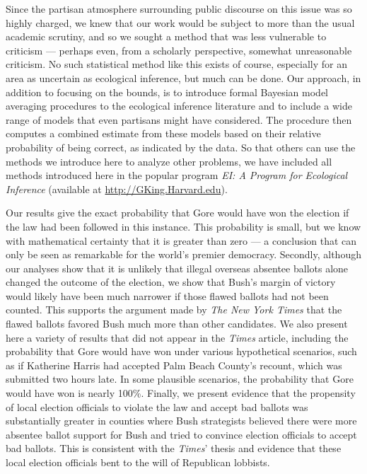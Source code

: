 \documentclass[11pt,titlepage]{article}
\begin{document}
Since the partisan atmosphere surrounding public discourse on this
issue was so highly charged, we knew that our work would be subject to
more than the usual academic scrutiny, and so we sought a method that
was less vulnerable to criticism --- perhaps even, from a scholarly
perspective, somewhat unreasonable criticism.  No such statistical
method like this exists of course, especially for an area as uncertain
as ecological inference, but much can be done.  Our approach, in
addition to focusing on the bounds, is to introduce formal Bayesian
model averaging procedures to the ecological inference literature and
to include a wide range of models that even partisans might have
considered.  The procedure then computes a combined estimate from
these models based on their relative probability of being correct, as
indicated by the data.  So that others can use the methods we
introduce here to analyze other problems, we have included all methods
introduced here in the popular program \emph{EI: A Program for
  Ecological Inference} (available at \url{http://GKing.Harvard.edu}).

Our results give the exact probability that Gore would have won the
election if the law had been followed in this instance.  This
probability is small, but we know with mathematical certainty that it
is greater than zero --- a conclusion that can only be seen as
remarkable for the world's premier democracy.  Secondly, although our
analyses show that it is unlikely that illegal overseas absentee
ballots alone changed the outcome of the election, we show that Bush's
margin of victory would likely have been much narrower if those flawed
ballots had not been counted.  This supports the argument made by
\emph{The New York Times} that the flawed ballots favored Bush much
more than other candidates.  We also present here a variety of results
that did not appear in the \emph{Times} article, including the
probability that Gore would have won under various hypothetical
scenarios, such as if Katherine Harris had accepted Palm Beach
County's recount, which was submitted two hours late.  In some
plausible scenarios, the probability that Gore would have won is
nearly 100\%.  Finally, we present evidence that the propensity of
local election officials to violate the law and accept bad ballots was
substantially greater in counties where Bush strategists believed
there were more absentee ballot support for Bush and tried to convince
election officials to accept bad ballots.  This is consistent with the
\emph{Times}' thesis and evidence that these local election officials
bent to the will of Republican lobbists.
\end{document}
